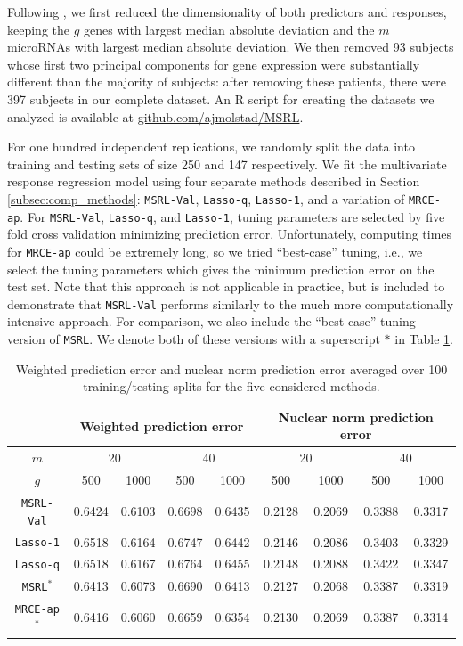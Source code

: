 \documentclass[12pt]{article}
\begin{document}
Following \citet{wang2015joint}, we first reduced the dimensionality of both predictors and responses, keeping the $g$ genes with largest median absolute deviation and the $m$ microRNAs with largest median absolute deviation.  We then removed 93 subjects whose first two principal components for gene expression were substantially different than the majority of subjects: after removing these patients, there were 397 subjects in our complete dataset. An R script for creating the datasets we analyzed is available at \href{http://github.com/ajmolstad/MSRL}{github.com/ajmolstad/MSRL}. 

For one hundred independent replications, we randomly split the data into training and testing sets of size 250 and 147 respectively. We fit the multivariate response regression model using four separate methods described in Section \ref{subsec:comp_methods}: \texttt{MSRL-Val}, \texttt{Lasso-q}, \texttt{Lasso-1}, and a variation of \texttt{MRCE-ap}. For \texttt{MSRL-Val}, \texttt{Lasso-q}, and \texttt{Lasso-1}, tuning parameters are selected by five fold cross validation minimizing prediction error. Unfortunately, computing times for \texttt{MRCE-ap} could be extremely long, so we tried ``best-case'' tuning, i.e., we select the tuning parameters which gives the minimum prediction error on the test set. Note that this approach is not applicable in practice, but is included to demonstrate that \texttt{MSRL-Val} performs similarly to the much more computationally intensive approach. For comparison, we also include the ``best-case'' tuning version of \texttt{MSRL}.  We denote both of these versions with a superscript $*$ in Table \ref{table:TCGA}.

\begin{table}[t!]
\centering
\begin{tabular}{|c|cc|cc|cc|cc|}
  \hline
  & \multicolumn{4}{c|}{Weighted prediction error} & \multicolumn{4}{|c|}{Nuclear norm prediction error} \\
  \hline
$m$ & \multicolumn{2}{c|}{20} & \multicolumn{2}{c|}{40} & \multicolumn{2}{c|}{20} & \multicolumn{2}{c|}{40} \\
$g$ &  500 & 1000 & 500 & 1000 & 500 & 1000 & 500 & 1000 \\ 
  \hline
   \texttt{MSRL-Val} & 0.6424 & 0.6103 & 0.6698 & 0.6435 & 0.2128 & 0.2069 & 0.3388 & 0.3317 \\ 
 \texttt{Lasso-1}  & 0.6518 & 0.6164 & 0.6747 & 0.6442 & 0.2146 & 0.2086 & 0.3403 & 0.3329 \\ 
   \texttt{Lasso-q} & 0.6518 & 0.6167 & 0.6764 & 0.6455 & 0.2148 & 0.2088 & 0.3422 & 0.3347 \\ 
   \hline
   \hline
   \texttt{MSRL}$^*$ & 0.6413 & 0.6073 & 0.6690 & 0.6413 & 0.2127 & 0.2068 & 0.3387 & 0.3319 \\ 
  \texttt{MRCE-ap}$^*$ & 0.6416 & 0.6060 & 0.6659 & 0.6354 & 0.2130 & 0.2069 & 0.3387 & 0.3314 \\ 
  \hline
\end{tabular}
\caption{Weighted prediction error and nuclear norm prediction error averaged over 100 training/testing splits for the five considered methods. }\label{table:TCGA}
\end{table}
\end{document}
